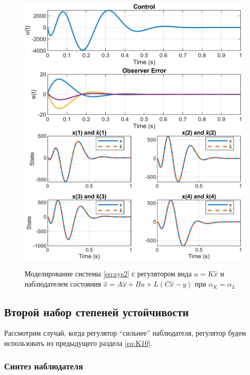 \begin{figure}[H]
    \centering
    \caption{Моделирование системы \eqref{eq:sys2} с регулятором вида $u=K\hat x$
    и наблюдателем состояния $\dot{\hat x}=A\hat x+Bu+L(C\hat x-y)$ при $\alpha_K=\alpha_L$}
    \includegraphics[width=\linewidth]{figs/task2_1.png}
    \label{fig:21}
\end{figure}



\subsection{Второй набор степеней устойчивости}


Рассмотрим случай, когда регулятор ``сильнее'' наблюдателя, регулятор будем
использовать из предыдущего раздела \autoref{eq:K10}.


\subsubsection{Синтез наблюдателя}

